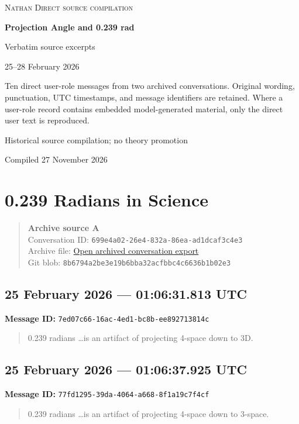\documentclass[11pt,letterpaper]{article}
\newcommand{\messageentry}[3]{%
  \Needspace{7\baselineskip}
  \subsection*{#1}
  {\small\textbf{Message ID:} \texttt{#2}}
  \vspace{2pt}
}
\newcommand{\sourceblock}[4]{%
  \begin{quote}\small
  \textbf{#1}\\
  Conversation ID: \texttt{#2}\\
  Archive file: \href{#3}{Open archived conversation export}\\
  Git blob: \texttt{#4}
  \end{quote}
}
\begin{document}
\begin{titlepage}
\centering
\vspace*{1.15in}
{\Large\textsc{Nathan Direct source compilation}\par}
\vspace{0.45in}
{\huge\bfseries Projection Angle and 0.239 rad\par}
\vspace{0.22in}
{\large Verbatim source excerpts\par}
\vspace{0.7in}
{\large 25--28 February 2026\par}
\vfill
\begin{minipage}{0.84\textwidth}
\small
Ten direct user-role messages from two archived conversations. Original wording, punctuation, UTC timestamps, and message identifiers are retained. Where a user-role record contains embedded model-generated material, only the direct user text is reproduced.
\end{minipage}
\vfill
{\small Historical source compilation; no theory promotion\par}
{\small Compiled 27 November 2026\par}
\end{titlepage}

\section*{0.239 Radians in Science}
\sourceblock{Archive source A}{699e4a02-26e4-832a-86ea-ad1dcaf3c4e3}{https://github.com/Satobloc/HsH/blob/main/DEVELOPMENT_FULL_CONVOS/SAT_CONVOS_13/26.02.24\%E2\%80\%A226.09.08\%E2\%80\%A2\%F0\%9F\%A7\%AE\%200.239\%20Radians\%20in\%20Science\%20\%E2\%80\%94\%20raw.json}{8b6794a2\hspace{0pt}be3e19b6\hspace{0pt}bba32acf\hspace{0pt}bbc4c663\hspace{0pt}6b1b02e3}

\messageentry{25 February 2026 --- 01:06:31.813 UTC}{7ed07c66-16ac-4ed1-bc8b-ee892713814c}{}
\begin{quote}
0.239 radians …is an artifact of projecting 4-space down to 3D.
\end{quote}

\messageentry{25 February 2026 --- 01:06:37.925 UTC}{77fd1295-39da-4064-a668-8f1a19c7f4cf}{}
\begin{quote}
0.239 radians …is an artifact of projecting 4-space down to 3-space.
\end{quote}
\end{document}
